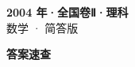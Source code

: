 \documentclass[zihao=-4, a4paper]{ctexart}
\begin{document}
\begin{center}
  {\Large\bfseries 2004 年·全国卷Ⅱ·理科}\\[4pt]
  {\large 数学 · 简答版}
\end{center}
\medskip
{}

\clearpage
{}
\begin{center}{\Large\bfseries 答案速查}\end{center}
\medskip

\end{document}
